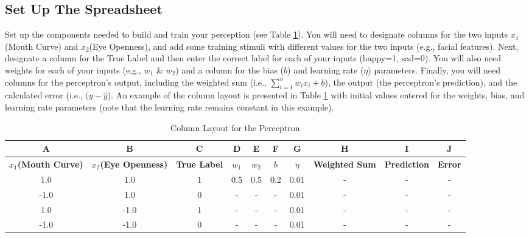 \subsection{Set Up The Spreadsheet}
Set up the components needed to build and train your perception (see Table \ref{tab:perceptron_setup}).  You will need to designate columns for the two inputs $x_1$(Mouth Curve) and $x_2$(Eye Openness), and add some training stimuli with different values for the two inputs (e.g., facial features).  Next, designate a column for the True Label and then enter the correct label for each of your inputs (happy=1, sad=0). You will also need weights for each of your inputs (e.g., $w_1$ \& $w_2$) and a column for the bias ($b$) and learning rate ($\eta$) parameters.  Finally, you will need columns for the perceptron's output, including the weighted sum (i.e., $\sum_{i=1}^nw_ix_i+b$), the output (the perceptron's prediction), and the calculated error (i.e., $(y-\hat y$).  An example of the column layout is presented in Table \ref{tab:perceptron_setup} with initial values entered for the weights, bias, and learning rate parameters (note that the learning rate remains constant in this example).
\begin{table}[h!]
\centering
\fontsize{9}{12}\selectfont %
\begin{tabular}{@{}|c|c|c|c|c|c|c|c|c|c|@{}}
\hline
\rowcolor{gray!30}\textbf{A} & \textbf{B} & \textbf{C} & \textbf{D} & \textbf{E} & \textbf{F} & \textbf{G} & \textbf{H} & \textbf{I} & \textbf{J} \\ \hline
\textbf{$x_1$(Mouth Curve)} & \textbf{$x_2$(Eye Openness)} & \textbf{True Label} & \textbf{$w_1$} & \textbf{$w_2$} & \textbf{$b$} & \textbf{$\eta$} & \textbf{Weighted Sum} & \textbf{Prediction} & \textbf{Error} \\ \hline
1.0                          & 1.0                           & 1                      & 0.5                 & 0.5                & 0.2     &0.01        & -                      & -                     & -                 \\ \hline
-1.0                         & 1.0                           & 0                      & -                 & -                & -     &0.01        & -                      & -                     & -                 \\ \hline
1.0                          & -1.0                           & 1                      & -                 & -                & -     &0.01        & -                      & -                     & -                 \\ \hline
-1.0                         & -1.0                           & 0                      & -                 & -                & -     &0.01        & -                      & -                     & -                 \\ \hline
\end{tabular}
\caption{Column Layout for the Perceptron}
\label{tab:perceptron_setup}
\end{table}

